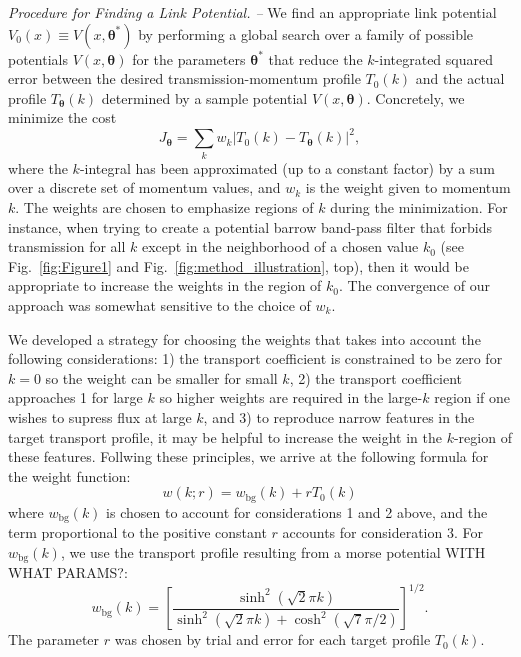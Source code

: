 \documentclass[twocolumn,amsmath,amssymb,showpacs,prl,superscriptaddress,aps]{revtex4-1}
\begin{document}
{\it Procedure for Finding a Link Potential. --}
We find an appropriate link potential $V_0(x) \equiv V(x,\bm{\theta}^*)$ by performing a global search over a family of possible potentials $V(x,\bm{\theta})$ for the parameters $\bm{\theta}^*$ that reduce the $k$-integrated squared error between the desired transmission-momentum profile $T_0(k)$ and the actual profile $T_{\bm\theta}(k)$ determined by a sample potential $V(x, \bm{\theta})$. Concretely, we minimize the cost
\begin{equation}\label{eq:cost1}
  J_{\bm{\theta}} = \sum_kw_k\left|T_0(k) - T_{\bm{\theta}}(k)\right|^2,
\end{equation}
where the $k$-integral has been approximated (up to a constant factor) by a sum over a discrete set of momentum values, and $w_k$ is the weight given to momentum $k$. The weights are chosen to emphasize regions of $k$ during the minimization. For instance, when trying to create a potential barrow band-pass filter that forbids transmission for all $k$ except in the neighborhood of a chosen value $k_0$ (see Fig.~\ref{fig:Figure1} and Fig.~\ref{fig:method_illustration}, top), then it would be appropriate to increase the weights in the region of $k_0$. The convergence of our approach was somewhat sensitive to the choice of $w_k$.

We developed a strategy for choosing the weights that takes into account the following considerations: 1) the transport coefficient is constrained to be zero for $k=0$ so the weight can be smaller for small $k$, 2) the transport coefficient approaches 1 for large $k$ so higher weights are required in the large-$k$ region if one wishes to supress flux at large $k$, and 3) to reproduce narrow features in the target transport profile, it may be helpful to increase the weight in the $k$-region of these features. Follwing these principles, we arrive at the following formula for the weight function:
\begin{equation}\label{eq:weight-of-k}
  w(k;r) = w_{\mathrm{bg}}(k) + rT_0(k)
\end{equation}
where $w_{\mathrm{bg}}(k)$ is chosen to account for considerations 1 and 2 above, and the term proportional to the positive constant $r$ accounts for consideration 3. For $w_{\mathrm{bg}}(k)$, we use the {\color{blue} transport profile resulting from a morse potential WITH WHAT PARAMS?}:
\begin{equation}\label{eq:weight-of-k}
  w_{\mathrm{bg}}(k) = \left[\frac{\sinh^2(\sqrt{2}\pi k)}{\sinh^2(\sqrt{2}\pi k) + \cosh^2(\sqrt{7}\pi/2)}\right]^{1/2}.
\end{equation}
The parameter $r$ was chosen by trial and error for each target profile $T_0(k)$.
\end{document}
